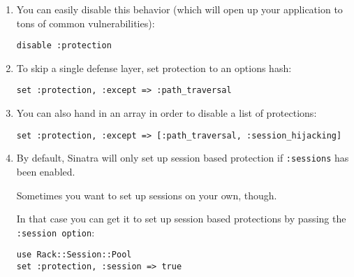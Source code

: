 \begin{enumerate}
\item 
You can easily disable this behavior (which will open up your
application to tons of common vulnerabilities):

\verb|disable :protection|
\item 
To skip a single defense layer, set protection to an options hash:

\begin{verbatim}
set :protection, :except => :path_traversal
\end{verbatim}
\item 
You can also hand in an array in order to disable a list of protections:

\begin{verbatim}
set :protection, :except => [:path_traversal, :session_hijacking]
\end{verbatim}
\item 
By default, Sinatra will only set up session based protection if
\verb|:sessions| has been enabled. 

Sometimes you want to set up sessions
on your own, though. 

In that case you can get it to set up session
based protections by passing the \verb|:session option|:

\begin{verbatim}
use Rack::Session::Pool
set :protection, :session => true
\end{verbatim}
\end{enumerate}

